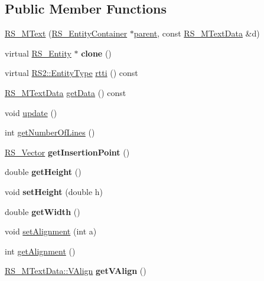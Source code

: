 \subsection*{Public Member Functions}
\begin{DoxyCompactItemize}
\item 
\hyperlink{classRS__MText_a802a27a5bbb1eb85b06b386758993218}{R\-S\-\_\-\-M\-Text} (\hyperlink{classRS__EntityContainer}{R\-S\-\_\-\-Entity\-Container} $\ast$\hyperlink{classRS__Entity_a80358a8d2fc6739a516a278dc500b49f}{parent}, const \hyperlink{classRS__MTextData}{R\-S\-\_\-\-M\-Text\-Data} \&d)
\item 
\hypertarget{classRS__MText_abcd7da00d191e4988981cb36836cdc8c}{virtual \hyperlink{classRS__Entity}{R\-S\-\_\-\-Entity} $\ast$ {\bfseries clone} ()}\label{classRS__MText_abcd7da00d191e4988981cb36836cdc8c}

\item 
virtual \hyperlink{classRS2_a8f26d1b981e1e85cff16738b43337e6a}{R\-S2\-::\-Entity\-Type} \hyperlink{classRS__MText_a9656ffb5c7ee3e279eeafe45cb2b795f}{rtti} () const 
\item 
\hyperlink{classRS__MTextData}{R\-S\-\_\-\-M\-Text\-Data} \hyperlink{classRS__MText_aff990d6690fd8898403449430aea3558}{get\-Data} () const 
\item 
void \hyperlink{classRS__MText_a7a57c85433bfb4a67a3f34522deaa302}{update} ()
\item 
int \hyperlink{classRS__MText_ac977f79abc3569615192cb82ca0545c3}{get\-Number\-Of\-Lines} ()
\item 
\hypertarget{classRS__MText_a6827e6b25329f6ca53b46396a1270c3b}{\hyperlink{classRS__Vector}{R\-S\-\_\-\-Vector} {\bfseries get\-Insertion\-Point} ()}\label{classRS__MText_a6827e6b25329f6ca53b46396a1270c3b}

\item 
\hypertarget{classRS__MText_ab403c745a4ac26bce6db111a2a8b74fe}{double {\bfseries get\-Height} ()}\label{classRS__MText_ab403c745a4ac26bce6db111a2a8b74fe}

\item 
\hypertarget{classRS__MText_a54549ad4cb40210d7734cc777b333496}{void {\bfseries set\-Height} (double h)}\label{classRS__MText_a54549ad4cb40210d7734cc777b333496}

\item 
\hypertarget{classRS__MText_a2c5e66b4bdccc1474378aef5a0c8b20d}{double {\bfseries get\-Width} ()}\label{classRS__MText_a2c5e66b4bdccc1474378aef5a0c8b20d}

\item 
void \hyperlink{classRS__MText_aa7df22ac9255880ffa0d4bda235b3269}{set\-Alignment} (int a)
\item 
int \hyperlink{classRS__MText_a082d97e0436092754fc891515e05a0e9}{get\-Alignment} ()
\item 
\hypertarget{classRS__MText_a27889ec51f1486ad814539405b990853}{\hyperlink{classRS__MTextData_a9f1c092c22fc207e48e1f3f23b93d54f}{R\-S\-\_\-\-M\-Text\-Data\-::\-V\-Align} {\bfseries get\-V\-Align} ()}\label{classRS__MText_a27889ec51f1486ad814539405b990853}


\end{DoxyCompactItemize}
